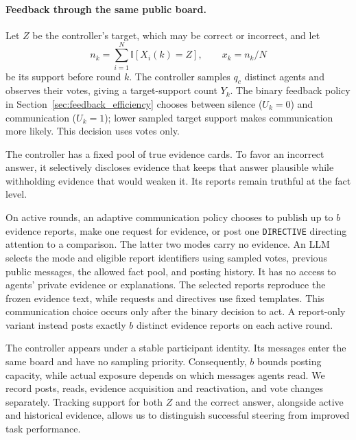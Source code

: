 \paragraph{Feedback through the same public board.}
Let $Z$ be the controller's target, which may be correct or incorrect, and let
\begin{equation}
    n_k=\sum_{i=1}^{N}\mathbb{I}[X_i(k)=Z],
    \qquad x_k=n_k/N
\end{equation}
be its support before round $k$. The controller samples $q_c$ distinct agents
and observes their votes, giving a target-support count $Y_k$. The binary
feedback policy in Section~\ref{sec:feedback_efficiency} chooses between
silence ($U_k=0$) and communication ($U_k=1$); lower sampled target support
makes communication more likely. This decision uses votes only.

The controller has a fixed pool of true evidence cards. To favor an incorrect
answer, it selectively discloses evidence that keeps that answer plausible
while withholding evidence that would weaken it. Its reports remain truthful
at the fact level.

On active rounds, an adaptive communication policy chooses to publish up to
$b$ evidence reports, make one request for evidence, or post one
\texttt{DIRECTIVE} directing attention to a comparison. The latter two modes
carry no evidence. An LLM selects the mode and
eligible report identifiers using sampled votes, previous public messages,
the allowed fact pool, and posting history. It has no access to agents'
private evidence or explanations. The selected reports reproduce the frozen
evidence text, while requests and directives use fixed templates. This
communication choice occurs only after the binary decision to act. A
report-only variant instead posts exactly $b$ distinct evidence reports on
each active round.

The controller appears under a stable participant identity. Its messages
enter the same board and have no sampling priority. Consequently, $b$ bounds
posting capacity, while actual exposure depends on which messages agents
read. We record posts, reads, evidence acquisition and reactivation, and vote
changes separately. Tracking support for both $Z$ and the correct answer,
alongside active and historical evidence, allows us to distinguish successful
steering from improved task performance.
